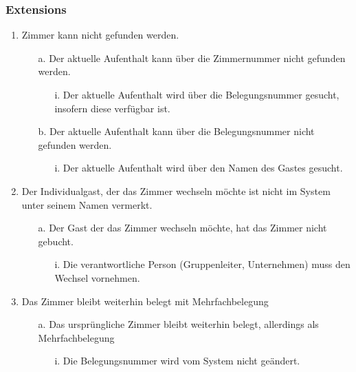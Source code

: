 \documentclass[./detailed_overview_usecases.tex]{subfiles}
\begin{document}
    \subsubsection*{Extensions}
    \begin{enumerate}
        \item Zimmer kann nicht gefunden werden.
            \begin{itemize}
                \item[a.] Der aktuelle Aufenthalt kann über die Zimmernummer nicht gefunden werden.
                    \begin{itemize}
                         \item[i.] Der aktuelle Aufenthalt wird über die Belegungsnummer gesucht, insofern diese verfügbar ist.
                    \end{itemize}
                \item[b.] Der aktuelle Aufenthalt kann über die Belegungsnummer nicht gefunden werden.
                       \begin{itemize}
                           \item[i.] Der aktuelle Aufenthalt wird über den Namen des Gastes gesucht.
                        \end{itemize}
            \end{itemize}
        \setcounter{enumi}{2}
        \item Der Individualgast, der das Zimmer wechseln möchte ist nicht im System unter seinem Namen vermerkt.
        \begin{itemize}
            \item[a.] Der Gast der das Zimmer wechseln möchte, hat das Zimmer nicht gebucht.
                \begin{itemize}
                    \item[i.] Die verantwortliche Person (Gruppenleiter, Unternehmen) muss den Wechsel vornehmen.
                \end{itemize}
        \end{itemize}
        \item Das Zimmer bleibt weiterhin belegt mit Mehrfachbelegung
        \begin{itemize}
            \item[a.] Das ursprüngliche Zimmer bleibt weiterhin belegt, allerdings als Mehrfachbelegung
                \begin{itemize}
                        \item[i.] Die Belegungsnummer wird vom System nicht geändert.

\end{itemize}
\end{itemize}
\end{enumerate}
\end{document}
